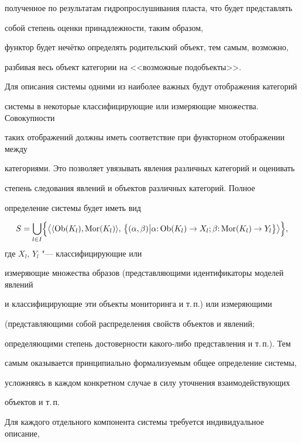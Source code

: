 полученное по результатам гидропрослушивания пласта, что будет представлять

собой степень оценки принадлежности, таким образом,

функтор будет нечётко определять родительский объект, тем самым, возможно,

разбивая весь объект категории на  <<возможные подобъекты>>.



Для описания системы одними из наиболее важных будут отображения категорий

системы в некоторые классифицирующие или измеряющие множества. Совокупности

таких отображений должны иметь соответствие при функторном отображении между

категориями. Это позволяет увязывать явления различных категорий и оценивать

степень следования явлений и объектов различных категорий. Полное

определение системы будет иметь вид

$$

S=\bigcup\limits_{l \in I}

\Bigl\{

\bigl\langle

\langle {\rm Ob}(K_l), {\rm Mor}(K_l) \rangle , \,

\bigl\{ (\alpha, \beta )\big| \alpha {:}\, {\rm Ob}(K_l)\to

X_l ;  \beta {:}\, {\rm Mor}(K_l )\to Y_l  \bigr\}

\bigr\rangle

\Bigr\} ,$$ где $X_l$, $Y_l$ "--- классифицирующие или

измеряющие множества образов (представляющими идентификаторы моделей явлений

и классифицирующие эти объекты мониторинга и т.\,п.) или измеряющими

(представляющими собой распределения свойств объектов и явлений;

определяющими степень достоверности какого-либо представления и т.\,п.). Тем

самым оказывается принципиально формализуемым общее определение системы,

усложняясь в каждом конкретном случае в силу уточнения взаимодействующих

объектов и т.\,п.



Для каждого отдельного компонента системы требуется индивидуальное описание,


